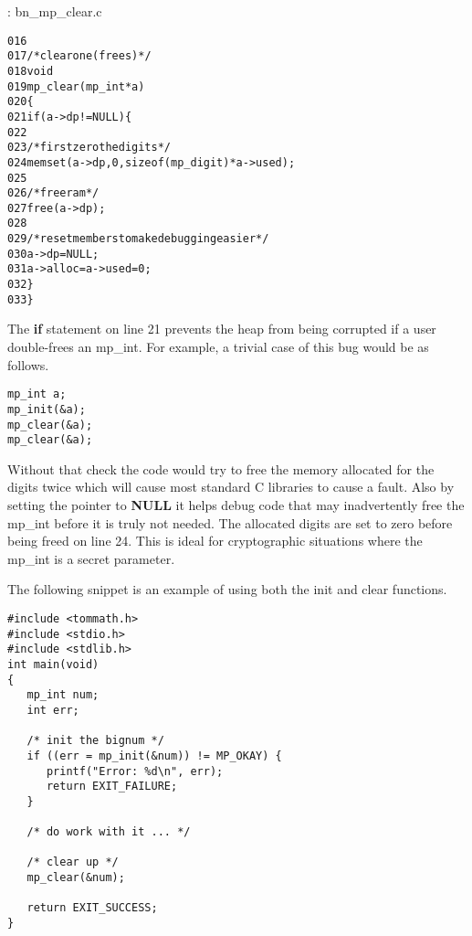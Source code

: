 \documentclass[b5paper]{book}
\begin{document}
\vspace{+3mm}\begin{small}
\hspace{-5.1mm}{\bf File}: bn\_mp\_clear.c
\vspace{-3mm}
\begin{alltt}
016   
017   /* clear one (frees)  */
018   void
019   mp_clear (mp_int * a)
020   \{
021     if (a->dp != NULL) \{
022   
023       /* first zero the digits */
024       memset (a->dp, 0, sizeof (mp_digit) * a->used);
025   
026       /* free ram */
027       free (a->dp);
028   
029       /* reset members to make debugging easier */
030       a->dp = NULL;
031       a->alloc = a->used = 0;
032     \}
033   \}
\end{alltt}
\end{small}

The \textbf{if} statement on line 21 prevents the heap from being corrupted if a user double-frees an 
mp\_int.  For example, a trivial case of this bug would be as follows.

\begin{verbatim}
mp_int a;
mp_init(&a);
mp_clear(&a);
mp_clear(&a);
\end{verbatim}

Without that check the code would try to free the memory allocated for the digits twice which will cause most standard C
libraries to cause a fault.  Also by setting the pointer to \textbf{NULL} it helps debug code that may inadvertently 
free the mp\_int before it is truly not needed.  The allocated digits are set to zero before being freed on line 24.  
This is ideal for cryptographic situations where the mp\_int is a secret parameter.

The following snippet is an example of using both the init and clear functions.  

\begin{small}
\begin{verbatim}
#include <tommath.h>
#include <stdio.h>
#include <stdlib.h>
int main(void)
{
   mp_int num;
   int err;
   
   /* init the bignum */
   if ((err = mp_init(&num)) != MP_OKAY) {
      printf("Error: %d\n", err);
      return EXIT_FAILURE;
   }
   
   /* do work with it ... */
   
   /* clear up */
   mp_clear(&num);
   
   return EXIT_SUCCESS;
}
\end{verbatim}
\end{small}
\end{document}
